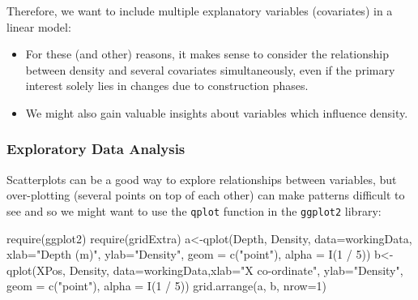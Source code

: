 \documentclass[
  oneside]{krantz}
\newenvironment{Shaded}{\begin{snugshade}}{\end{snugshade}}
\newcommand{\AttributeTok}[1]{\textcolor[rgb]{0.77,0.63,0.00}{#1}}
\newcommand{\DecValTok}[1]{\textcolor[rgb]{0.00,0.00,0.81}{#1}}
\newcommand{\FunctionTok}[1]{\textcolor[rgb]{0.00,0.00,0.00}{#1}}
\newcommand{\NormalTok}[1]{#1}
\newcommand{\OtherTok}[1]{\textcolor[rgb]{0.56,0.35,0.01}{#1}}
\newcommand{\SpecialCharTok}[1]{\textcolor[rgb]{0.00,0.00,0.00}{#1}}
\newcommand{\StringTok}[1]{\textcolor[rgb]{0.31,0.60,0.02}{#1}}
\begin{document}
Therefore, we want to include multiple explanatory variables (covariates) in a linear model:

\begin{itemize}
\item
  For these (and other) reasons, it makes sense to consider the relationship between density and several covariates simultaneously, even if the primary interest solely lies in changes due to construction phases.
\item
  We might also gain valuable insights about variables which influence density.
\end{itemize}

\hypertarget{exploratory-data-analysis-2}{%
\subsubsection{Exploratory Data Analysis}\label{exploratory-data-analysis-2}}

Scatterplots can be a good way to explore relationships between variables, but over-plotting (several points on top of each other) can make patterns difficult to see and so we might want to use the \texttt{qplot} function in the \texttt{ggplot2} library:

\begin{Shaded}
\begin{Highlighting}[]
\FunctionTok{require}\NormalTok{(ggplot2)}
\FunctionTok{require}\NormalTok{(gridExtra)}
\NormalTok{a}\OtherTok{\textless{}{-}}\FunctionTok{qplot}\NormalTok{(Depth, Density, }\AttributeTok{data=}\NormalTok{workingData, }\AttributeTok{xlab=}\StringTok{"Depth (m)"}\NormalTok{,}
\AttributeTok{ylab=}\StringTok{"Density"}\NormalTok{, }\AttributeTok{geom =} \FunctionTok{c}\NormalTok{(}\StringTok{"point"}\NormalTok{), }\AttributeTok{alpha =} \FunctionTok{I}\NormalTok{(}\DecValTok{1} \SpecialCharTok{/} \DecValTok{5}\NormalTok{))}
\NormalTok{b}\OtherTok{\textless{}{-}}\FunctionTok{qplot}\NormalTok{(XPos, Density, }\AttributeTok{data=}\NormalTok{workingData,}\AttributeTok{xlab=}\StringTok{"X co{-}ordinate"}\NormalTok{,}
\AttributeTok{ylab=}\StringTok{"Density"}\NormalTok{, }\AttributeTok{geom =} \FunctionTok{c}\NormalTok{(}\StringTok{"point"}\NormalTok{), }\AttributeTok{alpha =} \FunctionTok{I}\NormalTok{(}\DecValTok{1} \SpecialCharTok{/} \DecValTok{5}\NormalTok{))}
\FunctionTok{grid.arrange}\NormalTok{(a, b, }\AttributeTok{nrow=}\DecValTok{1}\NormalTok{)}
\end{Highlighting}
\end{Shaded}
\end{document}
